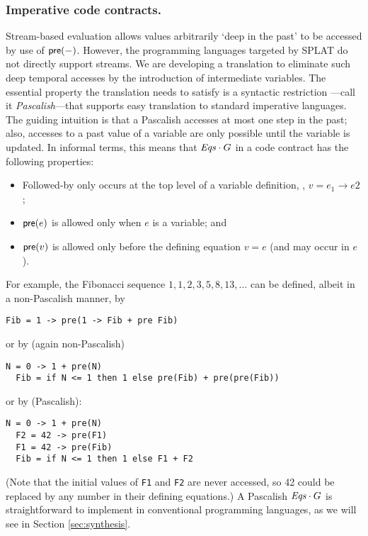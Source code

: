 \subsubsection*{Imperative code contracts.}
Stream-based evaluation allows values arbitrarily `deep in the past'
to be accessed by use of $\mathsf{pre}(-)$. However, the programming
languages targeted by SPLAT do not directly support streams.  We are
developing a translation to eliminate such deep temporal accesses by
the introduction of intermediate variables. The essential property the
translation needs to satisfy is a syntactic restriction ---call
it \emph{Pascalish}---that supports easy translation to standard
imperative languages.  The guiding intuition is that a Pascalish
{\Eqs} accesses at most one step in the past; also, accesses to a
past value of a variable are only possible until the variable is
updated. In informal terms, this means that ${\mathit{Eqs}}\cdot G$ in a code
contract has the following properties:
\begin{itemize}
\item Followed-by only occurs at the top level of a variable definition, \eg, $v = e_1 \to e2$;
\item $\mathsf{pre}(e)$ is allowed only when $e$ is a variable; and
\item $\mathsf{pre}(v)$ is allowed only before the defining equation $v = e$ (and may occur in $e$).
\end{itemize}
For example, the Fibonacci sequence $1,1,2,3,5,8,13,\ldots$ can be
defined, albeit in a non-Pascalish manner, by
{\small
\begin{lstlisting}[style=agree]
  Fib = 1 -> pre(1 -> Fib + pre Fib)
\end{lstlisting}
}
\noindent or by (again non-Pascalish)
{\small
\begin{lstlisting}[style=agree]
  N = 0 -> 1 + pre(N)
  Fib = if N <= 1 then 1 else pre(Fib) + pre(pre(Fib))
\end{lstlisting}
}
\noindent or by (Pascalish):
{\small
\begin{lstlisting}[style=agree]
  N = 0 -> 1 + pre(N)
  F2 = 42 -> pre(F1)
  F1 = 42 -> pre(Fib)
  Fib = if N <= 1 then 1 else F1 + F2
\end{lstlisting}
}
(Note that the initial values of \verb+F1+ and \verb+F2+ are never
accessed, so 42 could be replaced by any number in their defining
equations.) A Pascalish ${\mathit{Eqs}} \cdot G$ is straightforward to
implement in conventional programming languages, as we will see in
Section \ref{sec:synthesis}.

